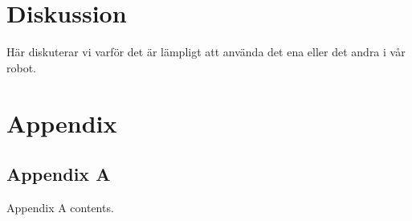 \documentclass[11pt]{article}
\begin{document}
\begin{flushleft}
\section{Diskussion}
\label{sec:Diskussion}
Här diskuterar vi varför det är lämpligt att använda det ena eller det andra i vår robot.
\pagebreak
		
\setcounter{secnumdepth}{0} %
	
\printbibliography %

\pagebreak
	
\section{Appendix}
\subsection{Appendix A} %
Appendix A contents.

\end{flushleft}
\end{document}
